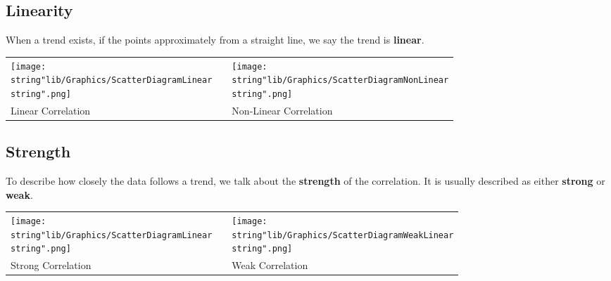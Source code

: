 \documentclass[11pt,a4paper]{book}
\begin{document}
\subsection{Linearity}

When a trend exists, if the points approximately from a straight line,
we say the trend is \textbf{linear}.
\begin{center}
\begin{tabular}{>{\centering}p{5cm}>{\centering}p{1cm}>{\centering}p{5cm}}
\centering{}\texttt{[image: \\string"lib/Graphics/ScatterDiagramLinear\\string".png]} &  & \centering{}\texttt{[image: \\string"lib/Graphics/ScatterDiagramNonLinear\\string".png]}\tabularnewline
Linear Correlation &  & Non-Linear Correlation\tabularnewline
\end{tabular}
\par\end{center}

\subsection{Strength}

To describe how closely the data follows a trend, we talk about the
\textbf{strength} of the correlation. It is usually described as either
\textbf{strong} or \textbf{weak}.
\begin{center}
\begin{tabular}{>{\centering}p{5cm}>{\centering}p{1cm}>{\centering}p{5cm}}
\centering{}\texttt{[image: \\string"lib/Graphics/ScatterDiagramLinear\\string".png]} &  & \centering{}\texttt{[image: \\string"lib/Graphics/ScatterDiagramWeakLinear\\string".png]}\tabularnewline
Strong Correlation &  & Weak Correlation\tabularnewline
\end{tabular}
\par\end{center}
\end{document}
